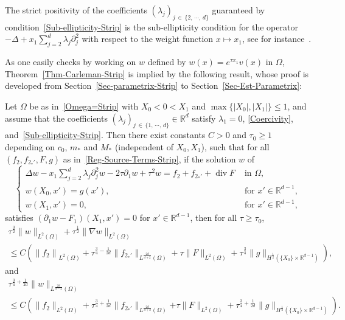\documentclass[AHL,Unicode,longabstracts]{cedram}
\newcommand*\R{\mathbb{R}}
\renewcommand{\leq}{\leqslant}
\renewcommand{\geq}{\geqslant}
\renewcommand{\div}{\operatorname{div}}
\begin{document}
\begin{rema}
The strict positivity of the coefficients $(\lambda_j)_{j\,\in\,\{2, \,\cdots,\, d\}}$ guaranteed by condition~\eqref{Sub-ellipticity-Strip} is the sub-ellipticity condition for the operator $-\Delta + x_1 \sum_{j =2}^d \lambda_j \partial_j^2$ with respect to the weight function $x\mapsto x_1$, see for instance~\cite[Part~1, Definition~3.30]{LeRousseaubookvolume1}.
\end{rema}

As one easily checks by working on $w$ defined by $w(x) = e^{\tau x_1} v(x)$ in $\Omega$, Theorem~\ref{Thm-Carleman-Strip} is implied by the following result, whose proof is developed from Section~\ref{Sec-parametrix-Strip} to Section~\ref{Sec-Est-Parametrix}:

\begin{theo}\label{Thm-Carleman-Strip-2}
Let $\Omega$ be as in~\eqref{Omega=Strip} with $X_0 \! <\! 0\! <\! X_1$ and $\max\{|X_0|, |X_1|\} \leq 1$, and assume that the coefficients $(\lambda_j)_{j\,\in\,\{1,\,\cdots,\,d\}} \in \R^d$ satisfy $\lambda_1 = 0$, \eqref{Coercivity}, and~\eqref{Sub-ellipticity-Strip}. Then there exist constants $C>0$ and $\tau_0 \geq 1$ depending on $c_0$, $m_*$ and $M_*$ (independent of $X_0, X_1$), such that for all $(f_2, f_{2_*'},F,g)$ as in~\eqref{Reg-Source-Terms-Strip}, if the solution $w$ of
\begin{equation}\label{Elliptic-Strip-w}
\left\{
\begin{array}{ll}
\Delta w-x_{1} \sum\limits_{j=2}^{d} \lambda_{j} \partial_{j}^{2} w - 2 \tau \partial_1 w + \tau^2 w = f_2 + f_{2_*'} + \div F & \text { in } \Omega,
\\
w\left(X_{0}, x'\right)=g (x'), &\text{ for } x' \in \R^{d-1},
\\
w\left(X_{1}, x'\right)= 0, &\text{ for } x' \in \R^{d-1},
\end{array}
\right.
\end{equation}
satisfies $(\partial_1 w - F_1)(X_1, x') = 0$ for $x' \in \R^{d-1}$, then for all $\tau \geq \tau_0$,
\begin{multline}\label{Carleman-Strip-w-1}
\tau^{\frac{3}{2}} \| w\|_{L^2(\Omega)} +
\tau^{\frac{1}{2}} \| \nabla w \|_{L^2(\Omega)}
\\ \leq C\left(
\left\| f_2 \right\|_{L^2(\Omega)} +
\tau^{\frac{3}{4}-\frac{1}{2d}} \| f_{2_*'} \|_{L^{\frac{2d}{d+2}}(\Omega)} +
\tau \| F \|_{L^2(\Omega)} +
\tau^{\frac{3}{4}} \| g \|_{H^{\frac{1}{2}}\left(\{X_0\} \times \R^{d-1}\right)}
\right),
\end{multline}
and
\begin{multline}\label{Carleman-Strip-w-2}
\tau^{\frac{3}{4}+\frac{1}{2d}} \| w\|_{L^{\frac{2d}{d-2}}(\Omega)}
\\
\leq C\left(
\| f_2 \|_{L^2(\Omega)} +
\tau^{\frac{3}{4}+\frac{1}{2d}} \| f_{2_*'} \|_{L^{\frac{2d}{d+2}}(\Omega)}
\right.
\left. +
\tau \| F \|_{L^2(\Omega)} +
\tau^{\frac{3}{4}+\frac{1}{2d}} \| g \|_{H^{\frac{1}{2}}(\{X_0\} \times \R^{d-1})}
\right).
\end{multline}
\end{theo}
\end{document}
